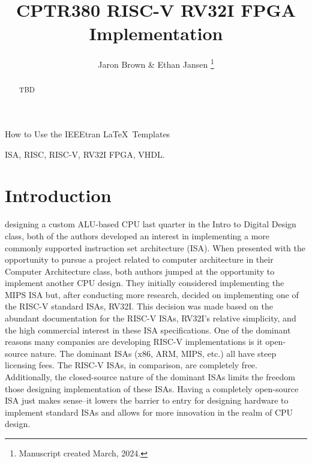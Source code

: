\documentclass[lettersize,journal]{IEEEtran}
\begin{document}
\title{CPTR380 RISC-V RV32I FPGA Implementation}
\author{Jaron Brown & Ethan Jansen
\thanks{Manuscript created March, 2024.}}

%
{How to Use the IEEEtran \LaTeX \ Templates}

\maketitle

\begin{abstract}
TBD
\end{abstract}

\begin{IEEEkeywords}
ISA, RISC, RISC-V, RV32I FPGA, VHDL.
\end{IEEEkeywords}


\section{Introduction}
 designing a custom ALU-based CPU last quarter in the Intro to Digital Design class, both of the authors developed an interest in implementing a more commonly supported instruction set architecture (ISA). When presented with the opportunity to pursue a project related to computer architecture in their Computer Architecture class, both authors jumped at the opportunity to implement another CPU design. They initially considered implementing the MIPS ISA but, after conducting more research, decided on implementing one of the RISC-V standard ISAs, RV32I. This decision was made based on the abundant documentation for the RISC-V ISAs, RV32I's relative simplicity, and the high commercial interest in these ISA specifications.
One of the dominant reasons many companies are developing RISC-V implementations is it open-source nature. The dominant ISAs (x86, ARM, MIPS, etc.) all have steep licensing fees. The RISC-V ISAs, in comparison, are completely free. Additionally, the closed-source nature of the dominant ISAs limits the freedom those designing implementation of these ISAs. Having a completely open-source ISA just makes sense--it lowers the barrier to entry for designing hardware to implement standard ISAs and allows for more innovation in the realm of CPU design.  
\end{document}
